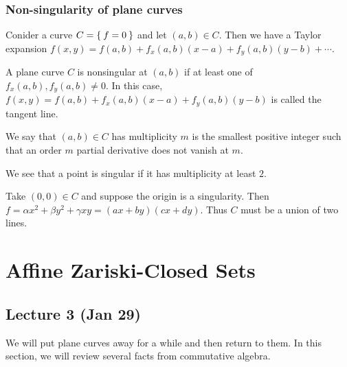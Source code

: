 \documentclass[twoside, 10pt]{article}
\begin{document}
    \subsubsection{Non-singularity of plane curves}
    Conider a curve $C = \Set{f=0}$ and let $(a,b) \in C$. Then we have a Taylor expansion $f(x,y) = f(a,b) + f_x(a,b)(x-a) + f_y(a,b)(y-b) + \cdots$.
   
    \begin{defn}
        A plane curve $C$ is nonsingular at $(a,b)$ if at least one of $f_x(a,b), f_y(a,b) \neq 0$. In this case, $f(x,y) = f(a,b) + f_x(a,b)(x-a) + f_y(a,b)(y-b)$ is called the tangent line.
    \end{defn}

    \begin{defn}[Multiplicity]
        We say that $(a,b) \in C$ has multiplicity $m$ is the smallest positive integer such that an order $m$ partial derivative does not vanish at $m$.
    \end{defn}

    We see that a point is singular if it has multiplicity at least $2$.

    \begin{exm}
        Take $(0,0) \in C$ and suppose the origin is a singularity. Then $f = \alpha x^2 + \beta y^2 + \gamma xy = (ax+by)(cx+dy)$. Thus $C$ must be a union of two lines.
    \end{exm}

    \section{Affine Zariski-Closed Sets}
    \subsection{Lecture 3 (Jan 29)}

    We will put plane curves away for a while and then return to them. In this section, we will review several facts from commutative algebra.
\end{document}
